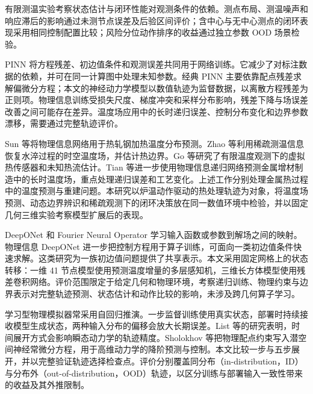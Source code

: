 有限测温实验考察状态估计与闭环性能对观测条件的依赖。测点布局、测温噪声和响应滞后的影响通过未测节点误差及后验区间评价；含中心与无中心测点的闭环表现采用相同控制配置比较；风险分位动作排序的收益通过独立参数 OOD 场景检验。



PINN 将方程残差、初边值条件和观测误差共同用于网络训练\cite{raissi2019pinn}。它减少了对标注数据的依赖，并可在同一计算图中处理未知参数。经典 PINN 主要依靠配点残差求解偏微分方程；本文的神经动力学模型以数值轨迹为监督数据，以离散方程残差为正则项。物理信息训练受损失尺度、梯度冲突和采样分布影响\cite{wang2021gradient,krishnapriyan2021failure}，残差下降与场误差改善之间可能存在差异。温度场应用中的长时递归误差、控制分布变化和边界参数漂移，需要通过完整轨迹评价。

Sun 等将物理信息网络用于热轧钢加热温度分布预测\cite{sun2025steel}。Zhao 等利用稀疏测温信息恢复水淬过程的时空温度场，并估计热边界\cite{zhao2022quenching}。Go 等研究了有限温度观测下的虚拟热传感器和未知热流估计\cite{go2023sensor}。Tian 等进一步使用物理信息递归网络预测金属增材制造中的长时温度场，重点处理递归误差和工艺变化\cite{tian2025longhorizon}。上述工作分别处理金属热过程中的温度预测与重建问题。本研究以炉温动作驱动的热处理轨迹为对象，将温度场预测、动态边界辨识和稀疏观测下的闭环决策放在同一数值环境中检验，并以固定几何三维实验考察模型扩展后的表现。


DeepONet 和 Fourier Neural Operator 学习输入函数或参数到解场之间的映射\cite{lu2021deeponet,li2021fno}。物理信息 DeepONet 进一步把控制方程用于算子训练，可面向一类初边值条件快速求解\cite{wang2021pideeponet}。这类研究为一族初边值问题提供了共享表示。本文采用固定网格上的状态转移：一维 41 节点模型使用预测温度增量的多层感知机，三维长方体模型使用残差卷积网络。评价范围限定于给定几何和物理环境，考察递归训练、物理约束与边界表示对完整轨迹预测、状态估计和动作比较的影响，未涉及跨几何算子学习。

学习型物理模拟器常采用自回归推演。一步监督训练使用真实状态，部署时持续接收模型生成状态，两种输入分布的偏移会放大长期误差。List 等的研究表明，时间展开方式会影响瞬态动力学的轨迹精度\cite{list2025unrolled}。Sholokhov 等把物理配点约束写入潜空间神经常微分方程，用于高维动力学的降阶预测与控制\cite{sholokhov2023pinode}。本文比较一步与五步展开，并以完整验证轨迹选择检查点。评价分别覆盖同分布（in-distribution，ID）与分布外（out-of-distribution，OOD）轨迹，以区分训练与部署输入一致性带来的收益及其外推限制。

